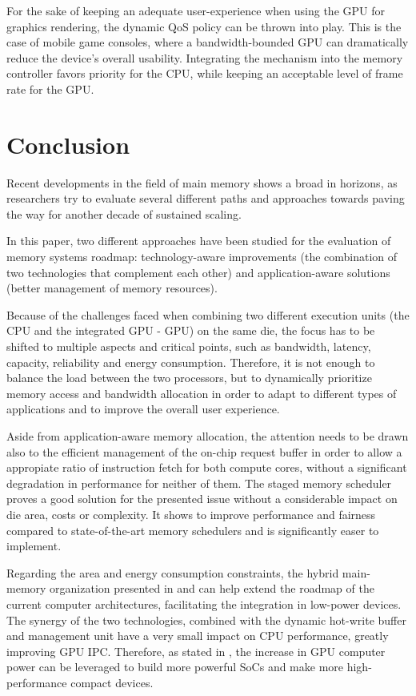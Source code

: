 \documentclass[journal]{IEEEtran}
\begin{document}
For the sake of keeping an adequate user-experience when using the GPU for graphics rendering, the dynamic QoS policy can be thrown into play. This is the case of mobile game consoles, where a bandwidth-bounded GPU can dramatically reduce the device's overall usability. Integrating the mechanism into the memory controller favors priority for the CPU, while keeping an acceptable level of frame rate for the GPU.

\section{Conclusion}
Recent developments in the field of main memory shows a broad in horizons, as researchers try to evaluate several different paths and approaches towards paving the way for another decade of sustained scaling. 

In this paper, two different approaches have been studied for the evaluation of memory systems roadmap: technology-aware improvements (the combination of two technologies that complement each other)  and application-aware solutions (better management of memory resources). 

Because of the challenges faced when combining two different execution units (the CPU and the integrated GPU - GPU) on the same die, the focus has to be shifted to multiple aspects and critical points, such as bandwidth, latency, capacity, reliability and energy consumption. Therefore, it is not enough to balance the load between the two processors, but to dynamically prioritize memory access \cite{LLC} and bandwidth allocation in order to adapt to different types of applications and to improve the overall user experience. 

Aside from application-aware memory allocation, the attention needs to be drawn also to the efficient management of the on-chip request buffer in order to allow a appropiate ratio of instruction fetch for both compute cores, without a significant degradation in performance for neither of them. The  staged memory scheduler proves a good solution for the presented issue without a considerable impact on die area, costs or complexity.  It shows to improve performance and fairness compared to state-of-the-art memory schedulers and is significantly easer to implement\cite{SmS}.

Regarding the area and energy consumption constraints, the hybrid main-memory organization presented in \cite{PRAM} and \cite{PDRAM} can help extend the roadmap of the current computer architectures, facilitating the integration in low-power devices. The synergy of the two technologies, combined with the dynamic hot-write buffer and management unit have a very small impact on CPU performance, greatly improving GPU IPC. Therefore, as stated in \cite{PRAM}, the increase in GPU computer power can be leveraged to build more powerful SoCs and make more high-performance compact devices.
\end{document}
